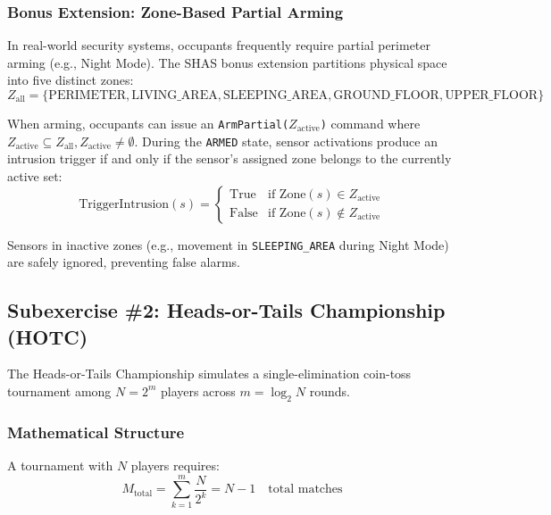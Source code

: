 \documentclass[11pt,a4paper]{article}
\begin{document}
\subsubsection{Bonus Extension: Zone-Based Partial Arming}

In real-world security systems, occupants frequently require partial perimeter arming (e.g., Night Mode). The SHAS bonus extension partitions physical space into five distinct zones:
\begin{equation}
Z_{\text{all}} = \{\text{PERIMETER}, \text{LIVING\_AREA}, \text{SLEEPING\_AREA}, \text{GROUND\_FLOOR}, \text{UPPER\_FLOOR}\}
\end{equation}

When arming, occupants can issue an \texttt{ArmPartial($Z_{\text{active}}$)} command where $Z_{\text{active}} \subseteq Z_{\text{all}}, Z_{\text{active}} \neq \emptyset$. During the \texttt{ARMED} state, sensor activations produce an intrusion trigger if and only if the sensor's assigned zone belongs to the currently active set:
\begin{equation}
\text{TriggerIntrusion}(s) = \begin{cases} 
\text{True} & \text{if } \text{Zone}(s) \in Z_{\text{active}} \\ 
\text{False} & \text{if } \text{Zone}(s) \notin Z_{\text{active}} 
\end{cases}
\end{equation}

Sensors in inactive zones (e.g., movement in \texttt{SLEEPING\_AREA} during Night Mode) are safely ignored, preventing false alarms.

\subsection{Subexercise \#2: Heads-or-Tails Championship (HOTC)}

The Heads-or-Tails Championship simulates a single-elimination coin-toss tournament among $N = 2^m$ players across $m = \log_2 N$ rounds.

\subsubsection{Mathematical Structure}

A tournament with $N$ players requires:
\begin{equation}
M_{\text{total}} = \sum_{k=1}^{m} \frac{N}{2^k} = N - 1 \quad \text{total matches}
\end{equation}
\end{document}
